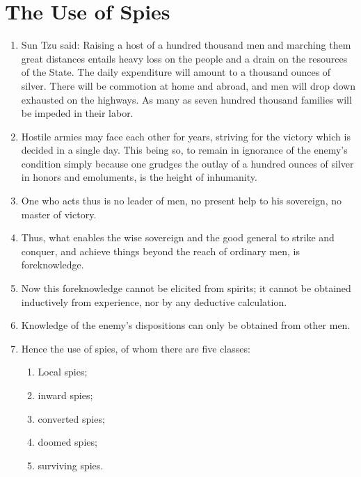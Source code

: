 \addtocounter{chapter}{1}\chapter*{The Use of Spies}
\begin{enumerate} 
  
\item Sun Tzu said:  Raising a host of a hundred thousand
    men and marching them great distances entails heavy loss
    on the people and a drain on the resources of the State. 
    The daily expenditure will amount to a thousand ounces
    of silver.  There will be commotion at home and abroad,
    and men will drop down exhausted on the highways. 
    As many as seven hundred thousand families will be impeded
    in their labor.

  \item Hostile armies may face each other for years, striving for the
    victory which is decided in a single day. This being so, to remain
    in ignorance of the enemy's condition simply because one grudges
    the outlay of a hundred ounces of silver in honors and emoluments,
    is the height of inhumanity.

  \item One who acts thus is no leader of men, no present help to his
    sovereign, no master of victory.

  \item Thus, what enables the wise sovereign and the good general to
    strike and conquer, and achieve things beyond the reach of
    ordinary men, is foreknowledge.

  \item Now this foreknowledge cannot be elicited from spirits; it
    cannot be obtained inductively from experience, nor by any
    deductive calculation.

  \item Knowledge of the enemy's dispositions can only be obtained
    from other men.

  \item Hence the use of spies, of whom there are five classes:
    \begin{enumerate}
    \item Local spies; \item inward spies; \item converted
      spies; \item doomed spies; \item surviving spies.
    \end{enumerate}



\end{enumerate}
